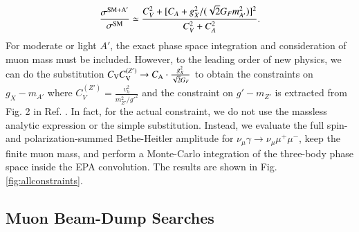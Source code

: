 \documentclass[onecolumn, aps, nofootinbib, prd, preprint, floats, floatfix, amsmath, amssymb, superscriptaddress, preprintnumbers]{revtex4-1}
\begin{document}
\begin{equation}
    \frac{\sigma^{\rm SM+A'}}{\sigma^{\rm SM}}\simeq\frac{C_V^2+[C_A+g_X^2/(\sqrt{2}G_F m_{A'}^2)]^2}{C_V^2+C_A^2}.
\end{equation}
For moderate or light $A'$, the exact phase space integration and consideration of muon mass must be included. However, to the leading order of new physics, we can do the substitution $C_{\rm V} C_{\rm V}^{(Z')}\to C_{\rm A}\cdot \frac{g_X^2}{\sqrt2G_F}$ to obtain the constraints on $g_X-m_{A'}$ where $C_{V}^{(Z')}=\frac{v_h^2}{m_{Z'}^2/g'^2}$ and the constraint on $g'-m_{Z'}$ is extracted from Fig. 2 in Ref. \cite{Altmannshofer:2014pba}.
In fact, for the actual constraint, we do not use the massless analytic expression or the simple substitution. Instead, we evaluate the full spin- and polarization-summed Bethe-Heitler amplitude for $\nu_\mu\gamma\to\nu_\mu\mu^+\mu^-$, keep the finite muon mass, and perform a Monte-Carlo integration of the three-body phase space inside the EPA convolution. The results are shown in Fig. \ref{fig:allconstraints}.

\subsection{Muon Beam-Dump Searches}
\label{subsec:muon-beam-dump}
\end{document}
